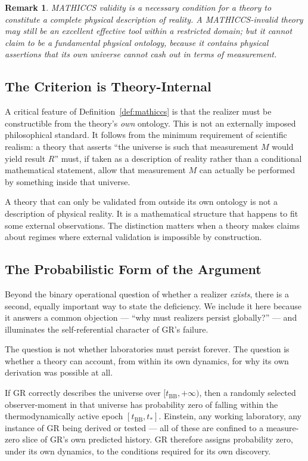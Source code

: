 \documentclass[11pt,a4paper]{article}
\newtheorem{remark}{Remark}
\begin{document}
\begin{remark}
MATHICCS validity is a necessary condition for a theory to constitute a complete
physical description of reality. A MATHICCS-invalid theory may still be an excellent
effective tool within a restricted domain; but it cannot claim to be a fundamental
physical ontology, because it contains physical assertions that its own universe cannot
cash out in terms of measurement.
\end{remark}

\subsection{The Criterion is Theory-Internal}

A critical feature of Definition~\ref{def:mathiccs} is that the realizer must be
constructible from the theory's \emph{own} ontology. This is not an externally imposed
philosophical standard. It follows from the minimum requirement of scientific
realism: a theory that asserts ``the universe is such that measurement $M$ would yield
result $R$'' must, if taken as a description of reality rather than a conditional
mathematical statement, allow that measurement $M$ can actually be performed by
something inside that universe.

A theory that can only be validated from outside its own ontology is not a description
of physical reality. It is a mathematical structure that happens to fit some external
observations. The distinction matters when a theory makes claims about regimes where
external validation is impossible by construction.

\subsection{The Probabilistic Form of the Argument}
\label{sec:probabilistic}

Beyond the binary operational question of whether a realizer \emph{exists}, there is
a second, equally important way to state the deficiency. We include it here because it
answers a common objection --- ``why must realizers persist globally?'' --- and
illuminates the self-referential character of GR's failure.

The question is not whether laboratories must persist forever. The question is whether
a theory can account, from within its own dynamics, for why its own derivation was
possible at all.

If GR correctly describes the universe over $[t_{\mathrm{BB}}, +\infty)$, then a
randomly selected observer-moment in that universe has probability zero of falling
within the thermodynamically active epoch $[t_{\mathrm{BB}}, t_*]$. Einstein, any
working laboratory, any instance of GR being derived or tested --- all of these are
confined to a measure-zero slice of GR's own predicted history. GR therefore assigns
probability zero, under its own dynamics, to the conditions required for its own
discovery.
\end{document}
